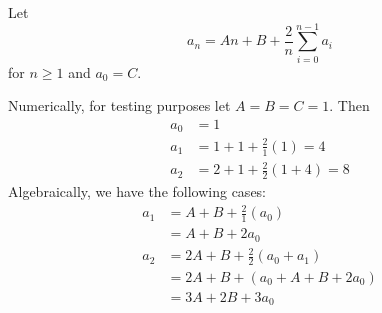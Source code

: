 







\newpage
Let
\[
a_n = An + B + \frac{2}{n} \sum_{i=0}^{n-1} a_i
\]
for $n \geq 1$ 
and $a_0 = C$.

Numerically, for testing purposes let $A = B = C = 1$.
Then
\begin{align*}
a_0 &= 1 \\
a_1 &= 1 + 1 + \frac{2}{1} \left( 1 \right) = 4 \\
a_2 &= 2 + 1 + \frac{2}{2} \left( 1 + 4\right) = 8 
\end{align*}
Algebraically, we have the following cases:
\begin{align*}
  a_1
  &= A + B + \frac{2}{1} (a_0) \\
  &= A + B + 2a_0 \\
  a_2 &= 2A + B + \frac{2}{2}(a_0 + a_1)  \\
      &= 2A + B + (a_0 + A + B + 2 a_0) \\
      &= 3A + 2B + 3 a_0
\end{align*}

